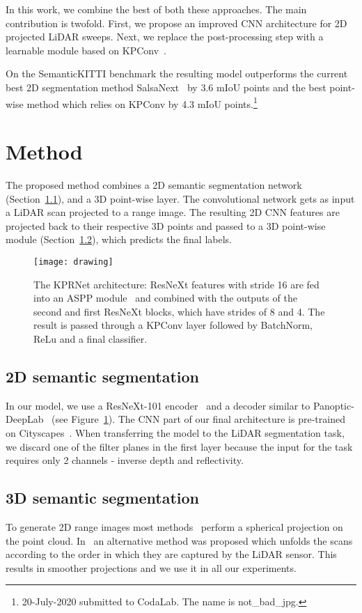 \documentclass[runningheads]{llncs}
\begin{document}
In this work, we combine the best of both these approaches. The main contribution is twofold. First, we propose an improved CNN architecture for 2D projected LiDAR sweeps. Next, we replace the post-processing step with a learnable module based on KPConv~\cite{KPConv}.

On the SemanticKITTI benchmark the resulting model outperforms the current best 2D segmentation method SalsaNext~\cite{SalsaNext} by 3.6 mIoU points and the best point-wise method which relies on KPConv by 4.3 mIoU points.\footnote{20-July-2020 submitted to CodaLab. The name is not\_bad\_jpg.}

\section{Method}
The proposed method combines a 2D semantic segmentation network (Section~\ref{2D}), and a 3D point-wise layer. The convolutional network gets as input a LiDAR scan projected to a range image. The resulting 2D CNN features are projected back to their respective 3D points and passed to a 3D point-wise module (Section~\ref{3D}), which predicts the final labels.


\begin{figure}
\centering
\texttt{[image: drawing]}
\caption{The KPRNet architecture: ResNeXt features with stride 16 are fed into an ASPP module~\cite{chen2017rethinking} and combined with the outputs of the second and first ResNeXt blocks, which have strides of 8 and 4. The result is passed through a KPConv layer followed by BatchNorm, ReLu and a final classifier.}
\label{fig:architecture}
\end{figure}

\subsection{2D semantic segmentation}\label{2D}

In our model, we use a ResNeXt-101 encoder~\cite{mahajan2018exploring} and a decoder similar to Panoptic-DeepLab~\cite{cheng2020panoptic} (see Figure~\ref{fig:architecture}). The CNN part of our final architecture is pre-trained on Cityscapes~\cite{Cityscapes}. When transferring the model to the LiDAR segmentation task, we discard one of the filter planes in the first layer  because the input for the task requires only 2 channels - inverse depth and reflectivity.

\subsection{3D semantic segmentation}\label{3D}
To generate 2D range images most methods~\cite{rangenet,SalsaNext,squeezesegv3} perform a spherical projection on the point cloud. 
In~\cite{triess2020scan} an alternative method was proposed which unfolds the scans according to the order in which they are captured by the LiDAR sensor. This results in smoother projections and we use it in all our experiments. 
\end{document}

